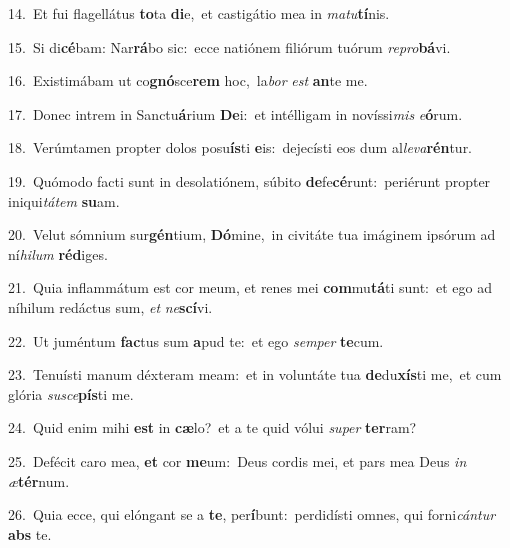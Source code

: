 {\numbfont\textcolor{\numbcolor}{14.}}~Et fui flagellátus \textbf{to}\-ta \textbf{di}\-e,~\star et castigátio mea in \textit{ma}\-\textit{tu}\textbf{tí}nis.\par
{\numbfont\textcolor{\numbcolor}{15.}}~Si di\-\textbf{cé}\-bam: Nar\-\textbf{rá}\-bo sic:~\star ecce natiónem filiórum tuórum \textit{re}\-\textit{pro}\textbf{bá}vi.\par
{\numbfont\textcolor{\numbcolor}{16.}}~Existimábam ut co\-\textbf{gnó}\-sce\textbf{rem} hoc,~\star la\textit{bor} \textit{est} \textbf{an}\-te me.\par
{\numbfont\textcolor{\numbcolor}{17.}}~Donec intrem in Sanctu\-\textbf{á}\-rium \textbf{De}\-i:~\star et intélligam in novíssi\textit{mis} \textit{e}\-\textbf{ó}rum.\par
{\numbfont\textcolor{\numbcolor}{18.}}~Verúmtamen propter dolos posu\-\textbf{ís}\-ti \textbf{e}\-is:~\star dejecísti eos dum al\-\textit{le}\-\textit{va}\textbf{rén}tur.\par
{\numbfont\textcolor{\numbcolor}{19.}}~Quómodo facti sunt in desolatiónem, súbito \textbf{de}\-fe\-\textbf{cé}\-runt:~\star periérunt propter iniqui\-\textit{tá}\-\textit{tem} \textbf{su}\-am.\par
{\numbfont\textcolor{\numbcolor}{20.}}~Velut sómnium sur\-\textbf{gén}\-tium, \textbf{Dó}\-mine,~\star in civitáte tua imáginem ipsórum ad ní\-\textit{hi}\-\textit{lum} \textbf{réd}\-iges.\par
{\numbfont\textcolor{\numbcolor}{21.}}~Quia inflammátum est cor meum, et renes mei \textbf{com}\-mu\-\textbf{tá}\-ti sunt:~\star et ego ad níhilum redáctus sum, \textit{et} \textit{ne}\-\textbf{scí}vi.\par
{\numbfont\textcolor{\numbcolor}{22.}}~Ut juméntum \textbf{fac}\-tus sum \textbf{a}\-pud te:~\star et ego \textit{sem}\-\textit{per} \textbf{te}\-cum.\par
{\numbfont\textcolor{\numbcolor}{23.}}~Tenuísti manum déxteram meam:~\dagger et in voluntáte tua \textbf{de}\-du\-\textbf{xís}\-ti me,~\star et cum glória \textit{su}\-\textit{sce}\textbf{pís}ti me.\par
{\numbfont\textcolor{\numbcolor}{24.}}~Quid enim mihi \textbf{est} in \textbf{cæ}\-lo?~\star et a te quid vólui \textit{su}\-\textit{per} \textbf{ter}\-ram?\par
{\numbfont\textcolor{\numbcolor}{25.}}~Defécit caro mea, \textbf{et} cor \textbf{me}\-um:~\star Deus cordis mei, et pars mea Deus \textit{in} \textit{æ}\-\textbf{tér}num.\par
{\numbfont\textcolor{\numbcolor}{26.}}~Quia ecce, qui elóngant se a \textbf{te}\-, per\-\textbf{í}\-bunt:~\star perdidísti omnes, qui forni\-\textit{cán}\-\textit{tur} \textbf{abs} te.\par
